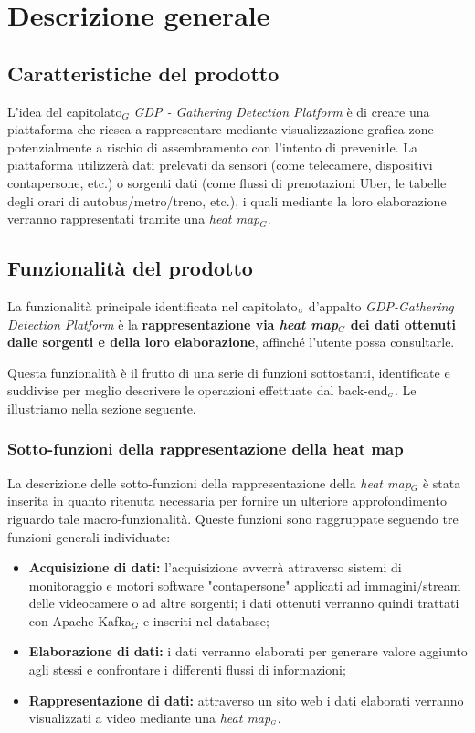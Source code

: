 \chapter{Descrizione generale}\label{DescrizioneGenerale}
\section{Caratteristiche del prodotto}\label{DescrizioneGeneraleCaratteristicheProdotto}
L'idea del capitolato$_G$ \textit{GDP - Gathering Detection Platform} è di creare una piattaforma che riesca a rappresentare mediante visualizzazione grafica zone potenzialmente a rischio di assembramento con l'intento di prevenirle.
La piattaforma utilizzerà dati prelevati da sensori (come telecamere, dispositivi contapersone, etc.) o sorgenti dati (come flussi di prenotazioni Uber, le tabelle degli orari di autobus/metro/treno, etc.), i quali mediante la loro elaborazione verranno rappresentati tramite una \textit{heat map$_G$}.

\section{Funzionalità del prodotto}\label{DescrizioneGeneraleFunzionalitàDelProdotto}
La funzionalità principale identificata nel capitolato$_{\scaleto{G}{3pt}}$ d'appalto \textit{GDP-Gathering Detection Platform} è la \textbf{rappresentazione via \textit{heat map$_G$} dei dati ottenuti dalle sorgenti e della loro elaborazione}, affinché l'utente possa consultarle.

Questa funzionalità è il frutto di una serie di funzioni sottostanti, identificate e suddivise per meglio descrivere le operazioni effettuate dal back-end$_{\scaleto{G}{3pt}}$.
Le illustriamo nella sezione seguente.

\subsection{Sotto-funzioni della rappresentazione della heat map}\label{DescrizioneGeneraleFunzionalitàDelProdottoSottoFunzioniDellaRappresentazioneDellaHeatmap}

La descrizione delle sotto-funzioni della rappresentazione della \textit{heat map$_G$} è stata inserita in quanto ritenuta necessaria per fornire un ulteriore approfondimento riguardo tale macro-funzionalità.
Queste funzioni sono raggruppate seguendo tre funzioni generali individuate:
\begin{itemize}
	\item \textbf{Acquisizione di dati:} l'acquisizione avverrà attraverso sistemi di monitoraggio e motori software "contapersone" applicati ad immagini/stream delle videocamere o ad altre sorgenti; i dati ottenuti verranno quindi trattati con Apache Kafka$_G$ e inseriti nel database;
	\item \textbf{Elaborazione di dati:} i dati verranno elaborati per generare valore aggiunto agli stessi e confrontare i differenti flussi di informazioni;
	\item \textbf{Rappresentazione di dati:} attraverso un sito web i dati elaborati verranno visualizzati a video mediante una \textit{heat map$_{\scaleto{G}{3pt}}$}.
\end{itemize}

